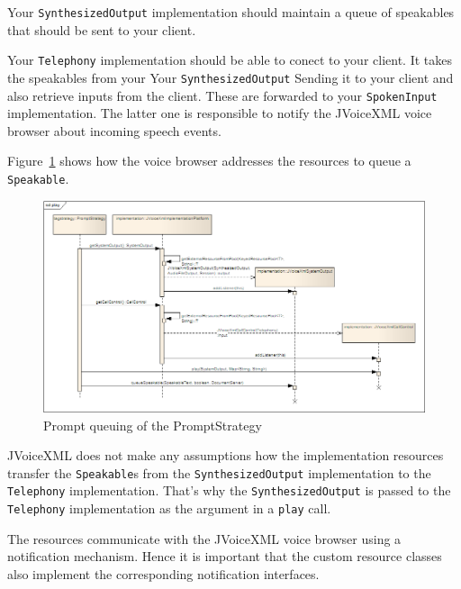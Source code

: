 \documentclass[11pt,a4paper]{book}
\begin{document}
Your \lstinline[language=Java]{SynthesizedOutput} implementation should maintain
a queue of speakables that should be sent to your client.

Your \lstinline[language=Java]{Telephony} implementation should be able to
conect to your client. It takes the speakables from your Your
\lstinline[language=Java]{SynthesizedOutput} Sending it to your client and also
retrieve inputs from the client. These are forwarded to your 
\lstinline[language=Java]{SpokenInput} implementation. The latter one is
responsible to notify the JVoiceXML voice browser about incoming speech events.

Figure~\ref{fig:play} shows how the voice browser addresses the resources to
queue a \lstinline[language=Java]{Speakable}.
\begin{figure}[htp]
\begin{center}
  \includegraphics[width=\linewidth]{sd-play}
  \caption{Prompt queuing of the PromptStrategy}
  \label{fig:play}
\end{center}
\end{figure}
JVoiceXML does not make any assumptions how the implementation resources
transfer the \lstinline[language=Java]{Speakable}s from the
\lstinline[language=Java]{SynthesizedOutput} implementation to the
\lstinline[language=Java]{Telephony} implementation. That's why the
\lstinline[language=Java]{SynthesizedOutput} is passed to the
\lstinline[language=Java]{Telephony} implementation as the argument in a
\lstinline[language=Java]{play} call.

The resources communicate with the JVoiceXML voice browser using a
notification mechanism. Hence it is important that the custom resource classes also implement
the corresponding notification interfaces.
\end{document}

